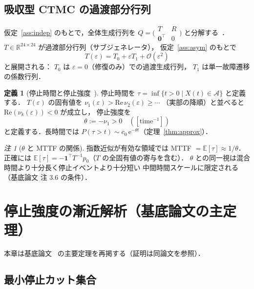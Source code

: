 \documentclass[12pt,a4paper]{article}
\theoremstyle{plain}
\theoremstyle{definition}
\newtheorem{definition}[theorem]{定義}
\theoremstyle{remark}
\newtheorem{remark}[theorem]{注}
\newcommand{\bE}{\mathbb{E}}           %
\newcommand{\calO}{\mathcal{O}}        %
\newcommand{\calA}{\mathcal{A}}        %
\newcommand{\eps}{\varepsilon}         %
\newcommand{\e}{\mathrm{e}}            %
\begin{document}
\subsection{吸収型 CTMC の過渡部分行列}

仮定~\ref{ass:indep} のもとで，全体生成行列を
$Q = \bigl(\begin{smallmatrix} T & R \\ \mathbf{0}^\top & 0 \end{smallmatrix}\bigr)$
と分解する~\cite{norris1997,keilson1979}．
$T\in\mathbb{R}^{24\times 24}$ が過渡部分行列（サブジェネレータ），
仮定~\ref{ass:asym} のもとで
\begin{equation}\label{eq:T_expand}
  T(\eps) = T_0 + \eps T_1 + \calO(\eps^2)
\end{equation}
と展開される：
$T_0$ は $\eps=0$（修復のみ）での過渡生成行列，
$T_1$ は単一故障遷移の係数行列．

\begin{definition}[停止時間と停止強度~{\cite{habase:v7}}]\label{def:theta}
  停止時間を $\tau = \inf\{t>0 \mid X(t)\in\calA\}$ と定義する．
  $T(\eps)$ の固有値を $\nu_1(\eps) > \mathrm{Re}\,\nu_2(\eps) \ge \cdots$
  （実部の降順）と並べると $\mathrm{Re}(\nu_k(\eps))<0$ が成立し，
  停止強度を
  \[
    \theta := -\nu_1 > 0 \quad ([\mathrm{time}^{-1}])
  \]
  と定義する．長時間では $P(\tau>t) \sim c_0\,\e^{-\theta t}$（定理~\ref{thm:approx}）．
\end{definition}

\begin{remark}[$\theta$ と MTTF の関係]
  指数近似が有効な領域では MTTF $= \bE[\tau] \approx 1/\theta$．
  正確には $\bE[\tau] = -\mathbf{1}^\top T^{-1} p_0$（$T$ の全固有値の寄与を含む）．
  $\theta$ との同一視は混合時間より十分長く停止イベントより十分短い
  中間時間スケールに限定される
  （基底論文 注 3.6 の条件）．
\end{remark}

\section{停止強度の漸近解析（基底論文の主定理）}\label{sec:analysis}

本章は基底論文~\cite{habase:v7} の主要定理を再掲する（証明は同論文を参照）．

\subsection{最小停止カット集合}
\end{document}

